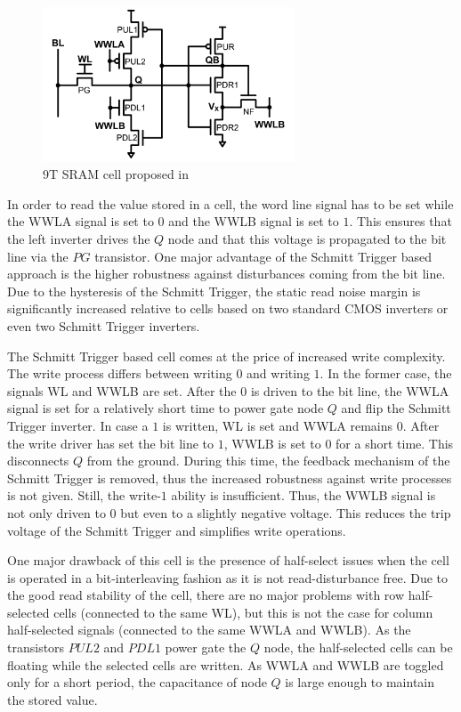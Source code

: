 \documentclass[conference]{IEEEtran}
\begin{document}
\begin{figure}
	\centering
	\includegraphics[width=7.5cm]{cell_cho.png}
	\caption{9T SRAM cell proposed in \cite{Cho2020}}
	\label{fig:cho}
\end{figure}

In order to read the value stored in a cell, the word line signal has to be set while the WWLA signal is set to $0$ and the WWLB signal is set to $1$. This ensures that the left inverter drives the $Q$ node and that this voltage is propagated to the bit line via the $PG$ transistor. One major advantage of the Schmitt Trigger based approach is the higher robustness against disturbances coming from the bit line. Due to the hysteresis of the Schmitt Trigger, the static read noise margin is significantly increased relative to cells based on two standard CMOS inverters or even two Schmitt Trigger inverters.

The Schmitt Trigger based cell comes at the price of increased write complexity. The write process differs between writing $0$ and writing $1$. In the former case, the signals WL and WWLB are set. After the $0$ is driven to the bit line, the WWLA signal is set for a relatively short time to power gate node $Q$ and flip the Schmitt Trigger inverter. In case a $1$ is written, WL is set and WWLA remains $0$. After the write driver has set the bit line to $1$, WWLB is set to $0$ for a short time. This disconnects $Q$ from the ground. During this time, the feedback mechanism of the Schmitt Trigger is removed, thus the increased robustness against write processes is not given. Still, the write-$1$ ability is insufficient. Thus, the WWLB signal is not only driven to $0$ but even to a slightly negative voltage. This reduces the trip voltage of the Schmitt Trigger and simplifies write operations.

One major drawback of this cell is the presence of half-select issues when the cell is operated in a bit-interleaving fashion as it is not read-disturbance free. Due to the good read stability of the cell, there are no major problems with row half-selected cells (connected to the same WL), but this is not the case for column half-selected signals (connected to the same WWLA and WWLB). As the transistors $PUL2$ and $PDL1$ power gate the $Q$ node, the half-selected cells can be floating while the selected cells are written. As WWLA and WWLB are toggled only for a short period, the capacitance of node $Q$ is large enough to maintain the stored value.
\end{document}
